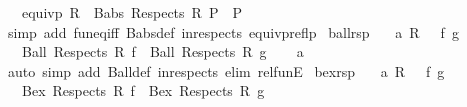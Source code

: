 \begin{isabellebody}
\ \ \ {\isachardoublequoteopen}equivp\ R\ {\isasymLongrightarrow}\ Babs\ {\isacharparenleft}{\kern0pt}Respects\ R{\isacharparenright}{\kern0pt}\ P\ {\isacharequal}{\kern0pt}\ P{\isachardoublequoteclose}\isanewline
%
\isadelimproof
\ \ %
\endisadelimproof
%
\isatagproof
{}\isamarkupfalse%
\ {\isacharparenleft}{\kern0pt}simp\ add{\isacharcolon}{\kern0pt}\ fun{\isacharunderscore}{\kern0pt}eq{\isacharunderscore}{\kern0pt}iff\ Babs{\isacharunderscore}{\kern0pt}def\ in{\isacharunderscore}{\kern0pt}respects\ equivp{\isacharunderscore}{\kern0pt}reflp{\isacharparenright}{\kern0pt}%
\endisatagproof
{\isafoldproof}%
%
\isadelimproof
\isanewline
%
\endisadelimproof
\isanewline
\isanewline
\isanewline
{}\isamarkupfalse%
\ ball{\isacharunderscore}{\kern0pt}rsp{\isacharcolon}{\kern0pt}\isanewline
\ \ \ a{\isacharcolon}{\kern0pt}\ {\isachardoublequoteopen}{\isacharparenleft}{\kern0pt}R\ {\isacharequal}{\kern0pt}{\isacharequal}{\kern0pt}{\isacharequal}{\kern0pt}{\isachargreater}{\kern0pt}\ {\isacharparenleft}{\kern0pt}{\isacharequal}{\kern0pt}{\isacharparenright}{\kern0pt}{\isacharparenright}{\kern0pt}\ f\ g{\isachardoublequoteclose}\isanewline
\ \ \ {\isachardoublequoteopen}Ball\ {\isacharparenleft}{\kern0pt}Respects\ R{\isacharparenright}{\kern0pt}\ f\ {\isacharequal}{\kern0pt}\ Ball\ {\isacharparenleft}{\kern0pt}Respects\ R{\isacharparenright}{\kern0pt}\ g{\isachardoublequoteclose}\isanewline
%
\isadelimproof
\ \ %
\endisadelimproof
%
\isatagproof
{}\isamarkupfalse%
\ a\ \isamarkupfalse%
\ {\isacharparenleft}{\kern0pt}auto\ simp\ add{\isacharcolon}{\kern0pt}\ Ball{\isacharunderscore}{\kern0pt}def\ in{\isacharunderscore}{\kern0pt}respects\ elim{\isacharcolon}{\kern0pt}\ rel{\isacharunderscore}{\kern0pt}funE{\isacharparenright}{\kern0pt}%
\endisatagproof
{\isafoldproof}%
%
\isadelimproof
\isanewline
%
\endisadelimproof
\isanewline
{}\isamarkupfalse%
\ bex{\isacharunderscore}{\kern0pt}rsp{\isacharcolon}{\kern0pt}\isanewline
\ \ \ a{\isacharcolon}{\kern0pt}\ {\isachardoublequoteopen}{\isacharparenleft}{\kern0pt}R\ {\isacharequal}{\kern0pt}{\isacharequal}{\kern0pt}{\isacharequal}{\kern0pt}{\isachargreater}{\kern0pt}\ {\isacharparenleft}{\kern0pt}{\isacharequal}{\kern0pt}{\isacharparenright}{\kern0pt}{\isacharparenright}{\kern0pt}\ f\ g{\isachardoublequoteclose}\isanewline
\ \ \ {\isachardoublequoteopen}{\isacharparenleft}{\kern0pt}Bex\ {\isacharparenleft}{\kern0pt}Respects\ R{\isacharparenright}{\kern0pt}\ f\ {\isacharequal}{\kern0pt}\ Bex\ {\isacharparenleft}{\kern0pt}Respects\ R{\isacharparenright}{\kern0pt}\ g{\isacharparenright}{\kern0pt}{\isachardoublequoteclose}\isanewline

\end{isabellebody}
